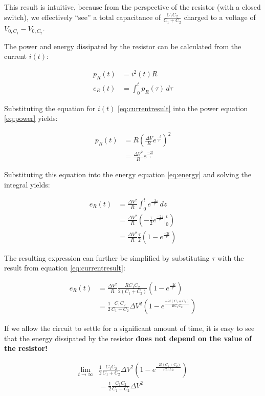 This result is intuitive, because from the perspective of the resistor (with a
closed   switch),   we   effectively   ``see''   a   total    capacitance   of
$\frac{C_1C_2}{C_1+C_2}$  charged  to  a voltage of $V_{0,C_1}  -  V_{0,C_2}$.

The power and  energy  dissipated  by  the resistor can be calculated from the
current $i(t)$:

\begin{align}
    p_R(t) &= i^2(t) R \label{eq:power} \\
    e_R(t) &= \int_0^t p_R(\tau)\,d\tau \label{eq:energy}
\end{align}

\newpage

Substituting  the equation for $i(t)$ \ref{eq:currentresult}  into  the  power
equation \ref{eq:power} yields:

\begin{align}
    p_R(t) &= R\left(\frac{\Delta V}{R} e^{\frac{-t}{\tau}}\right)^2 \\
           &= \frac{{\Delta V}^2}{R} e^{\frac{-2t}{\tau}}
\end{align}

Substituting  this  equation  into the  energy  equation  \ref{eq:energy}  and
solving the integral yields:

\begin{align}
    e_R(t) &= \frac{{\Delta V}^2}{R} \int_0^t e^{\frac{-2z}{\tau}}\,dz \\
           &= \frac{{\Delta V}^2}{R} \left(-\frac{\tau}{2} e^{\frac{-2z}{\tau}} \bigg|_0^t\right) \\
           &= \frac{{\Delta V}^2}{R} \frac{\tau}{2}\left(1 - e^{\frac{-2t}{\tau}}\right)
\end{align}

The resulting expression can further be simplified by substituting $\tau$ with
the result from equation \ref{eq:currentresult}:

\begin{align}
    e_R(t) &= \frac{{\Delta V}^2}{R} \frac{RC_1C_2}{2\left(C_1+C_2\right)}\left(1 - e^{\frac{-2t}{\tau}}\right) \\
           &= \frac{1}{2} \frac{C_1C_2}{C_1+C_2} {\Delta V}^2 \left(1 - e^{\frac{-2t\left(C_1+C_2\right)}{RC_1C_2}}\right)
\end{align}

If we allow the circuit to settle for a significant amount of time, it is easy
to see that  the  energy dissipated by the resistor \textbf{does not depend on
the value of the resistor!}

\begin{align}
    \lim_{t\to\infty} & \frac{1}{2} \frac{C_1C_2}{C_1+C_2} {\Delta V}^2 \left(1 - e^{\frac{-2t\left(C_1+C_2\right)}{RC_1C_2}}\right) \\
    &= \frac{1}{2} \frac{C_1C_2}{C_1+C_2} {\Delta V}^2 \label{eq:resistor-energy}
\end{align}
